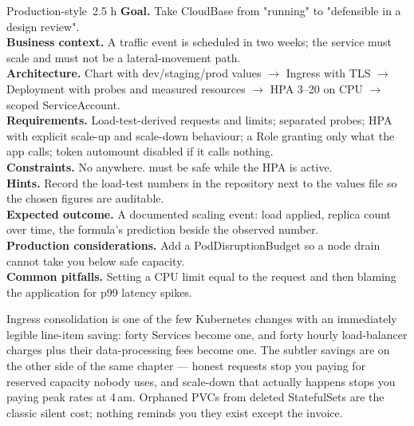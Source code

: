 \begin{minilab}{Production-style}{~2.5 h}
\textbf{Goal.} Take CloudBase from "running" to "defensible in a design review".\\
\textbf{Business context.} A traffic event is scheduled in two weeks; the service must scale and must not be a lateral-movement path.\\
\textbf{Architecture.} Chart with dev/staging/prod values $\rightarrow$ Ingress with TLS $\rightarrow$ Deployment with probes and measured resources $\rightarrow$ HPA 3--20 on CPU $\rightarrow$ scoped ServiceAccount.\\
\textbf{Requirements.} Load-test-derived requests and limits; separated probes; HPA with explicit scale-up and scale-down behaviour; a Role granting only what the app calls; token automount disabled if it calls nothing.\\
\textbf{Constraints.} No  anywhere.  must be safe while the HPA is active.\\
\textbf{Hints.} Record the load-test numbers in the repository next to the values file so the chosen figures are auditable.\\
\textbf{Expected outcome.} A documented scaling event: load applied, replica count over time, the formula's prediction beside the observed number.\\
\textbf{Production considerations.} Add a PodDisruptionBudget so a node drain cannot take you below safe capacity.\\
\textbf{Common pitfalls.} Setting a CPU limit equal to the request and then blaming the application for p99 latency spikes.
\end{minilab}


\begin{costnote}
Ingress consolidation is one of the few Kubernetes changes with an immediately legible line-item saving: forty  Services become one, and forty hourly load-balancer charges plus their data-processing fees become one. The subtler savings are on the other side of the same chapter --- honest requests stop you paying for reserved capacity nobody uses, and scale-down that actually happens stops you paying peak rates at 4\,am. Orphaned PVCs from deleted StatefulSets are the classic silent cost; nothing reminds you they exist except the invoice.
\end{costnote}

